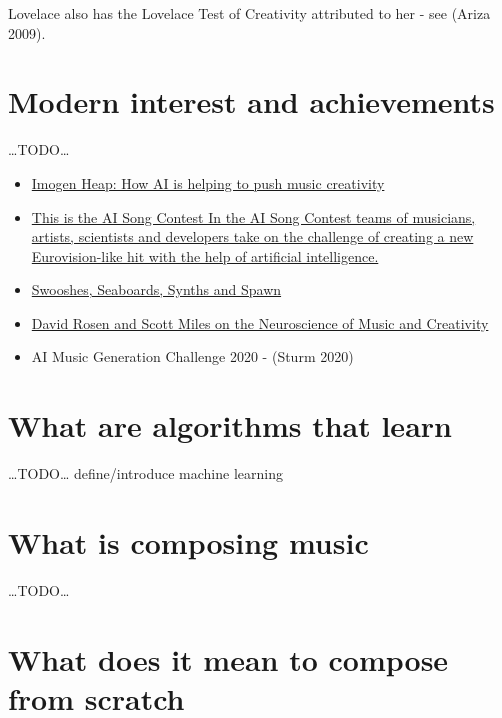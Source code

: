 \documentclass[12pt,a4paper,]{report}
\providecommand{\tightlist}{%
  \setlength{\itemsep}{0pt}\setlength{\parskip}{0pt}}
\begin{document}
Lovelace also has the Lovelace Test of Creativity attributed to her -
see (Ariza 2009).

\hypertarget{modern-interest-and-achievements}{%
\section{Modern interest and
achievements}\label{modern-interest-and-achievements}}

\ldots TODO\ldots{}

\begin{itemize}
\tightlist
\item
  \href{https://www.bbc.co.uk/news/av/technology-52236563}{Imogen Heap:
  How AI is helping to push music creativity}
\item
  \href{https://www.vprobroadcast.com/titles/ai-songcontest.html}{This
  is the AI Song Contest In the AI \hspace{0pt}\hspace{0pt}Song Contest
  teams of musicians, artists, scientists and developers take on the
  challenge of creating a new Eurovision-like hit with the help of
  artificial intelligence.}
\item
  \href{https://www.bbc.co.uk/programmes/m000cngg}{Swooshes, Seaboards,
  Synths and Spawn}
\item
  \href{https://overcast.fm/+S_7no2kwM}{David Rosen and Scott Miles on
  the Neuroscience of Music and Creativity}
\item
  AI Music Generation Challenge 2020 - (Sturm 2020)
\end{itemize}

\hypertarget{what-are-algorithms-that-learn}{%
\section{What are algorithms that
learn}\label{what-are-algorithms-that-learn}}

\ldots TODO\ldots{} define/introduce machine learning

\hypertarget{what-is-composing-music}{%
\section{What is composing music}\label{what-is-composing-music}}

\ldots TODO\ldots{}

\hypertarget{what-does-it-mean-to-compose-from-scratch}{%
\section{What does it mean to compose from
scratch}\label{what-does-it-mean-to-compose-from-scratch}}
\end{document}
